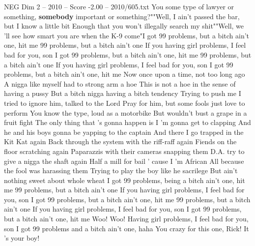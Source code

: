 \begin{textsample}{NEG Dim 2 – 2010 – Score -2.00 – 2010/605.txt}
You some type of lawyer or something, \textbf{somebody} important or something?""Well, I ain't passed the bar, but I know a little bit Enough that you won't illegally search my shit""Well, we 'll see how smart you are when the K-9 come"I got 99 problems, but a bitch ain't one, hit me 99 problems, but a bitch ain't one If you having girl problems, I feel bad for you, son I got 99 problems, but a bitch ain't one, hit me 99 problems, but a bitch ain't one If you having girl problems, I feel bad for you, son I got 99 problems, but a bitch ain't one, hit me Now once upon a time, not too long ago A nigga like myself had to strong arm a hoe This is not a hoe in the sense of having a pussy But a bitch nigga having a bitch tendency Trying to push me I tried to ignore him, talked to the Lord Pray for him, but some fools just love to perform You know the type, loud as a motorbike But wouldn't bust a grape in a fruit fight The only thing that 's gonna happen is I 'm gonna get to clapping And he and his boys gonna be yapping to the captain And there I go trapped in the Kit Kat again Back through the system with the riff-raff again Fiends on the floor scratching again Paparazzis with their cameras snapping them D.A. try to give a nigga the shaft again Half a mill for bail ' cause I 'm African All because the fool was harassing them Trying to play the boy like he sacrilege But ain't nothing sweet about whole wheat I got 99 problems, being a bitch ain't one, hit me 99 problems, but a bitch ain't one If you having girl problems, I feel bad for you, son I got 99 problems, but a bitch ain't one, hit me 99 problems, but a bitch ain't one If you having girl problems, I feel bad for you, son I got 99 problems, but a bitch ain't one, hit me Woo!
Woo!
Having girl problems, I feel bad for you, son I got 99 problems and a bitch ain't one, haha You crazy for this one, Rick!
It 's your boy!

\end{textsample}
